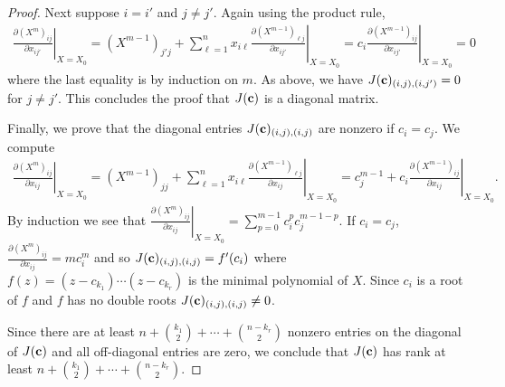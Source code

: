 \documentclass[12pt]{extarticle}
\theoremstyle{definition}
\numberwithin{theorem}{section}
\begin{document}
\begin{proof}
    Next suppose $i = i'$ and $j \neq j'$. Again using the product rule, 
    \begin{align*}
       \left. \frac{\partial(X^m)_{ij}}{\partial x_{ij'}}  \right|_{X = X_0} = 
       \left. (X^{m-1})_{j'j} +  \sum_{\ell=1}^n x_{i\ell} \frac{\partial (X^{m-1})_{\ell j}}{\partial x_{ij'}} \right |_{X = X_0}=
       \left.   c_{i} \frac{\partial (X^{m-1})_{i j}}{\partial x_{ij'}} \right |_{X = X_0} = 0
    \end{align*}
    where the last equality is by induction on $m$.
    As above, we have $J({\bf c})_{(i,j),(i,j')}=0$ for $j \neq j'$. 
    This concludes the proof that $J({\bf c})$ is a diagonal matrix.

    Finally, we prove that the diagonal entries $J({\bf c})_{(i,j), (i,j)}$ are nonzero if  $c_i = c_j$. We compute
    \begin{align*}
        \left. \frac{\partial(X^m)_{ij}}{\partial x_{ij}}  \right|_{X = X_0} = 
       \left. (X^{m-1})_{jj} +  \sum_{\ell=1}^n x_{i\ell} \frac{\partial (X^{m-1})_{\ell j}}{\partial x_{ij}} \right |_{X = X_0}=
       \left .c_j^{m-1} + c_i \frac{\partial (X^{m-1})_{i j}}{\partial x_{ij}}\right |_{X = X_0}.
    \end{align*}    
    By induction we see that
  $        \left. \frac{\partial(X^m)_{ij}}{\partial x_{ij}}  \right|_{X = X_0} = \sum_{p=0}^{m-1} c_i^p c_j^{m-1- p}.$
  If $c_i = c_j$, $\frac{\partial(X^m)_{ij}}{\partial x_{ij}} = mc_i^m$ and so $J({\bf c})_{(i,j),(i,j)}  = f'(c_i)$ where $f(z) = (z - c_{k_1}) \cdots (z - c_{k_r})$ is the minimal polynomial of $X$.  
     Since $c_i$ is a root of $f$ and $f$ has no double roots $J({\bf c})_{(i,j),(i,j)} \neq 0$.
    
    Since there are at least $n + \binom{k_1}{2} + \cdots +\binom{n-k_r}{2}$ nonzero entries on the diagonal of $J({\bf c})$ and all off-diagonal entries are zero, we conclude that $J({\bf c})$ has rank at least $n + \binom{k_1}{2} + \cdots +\binom{n-k_r}{2}$. 
\end{proof}
\end{document}
